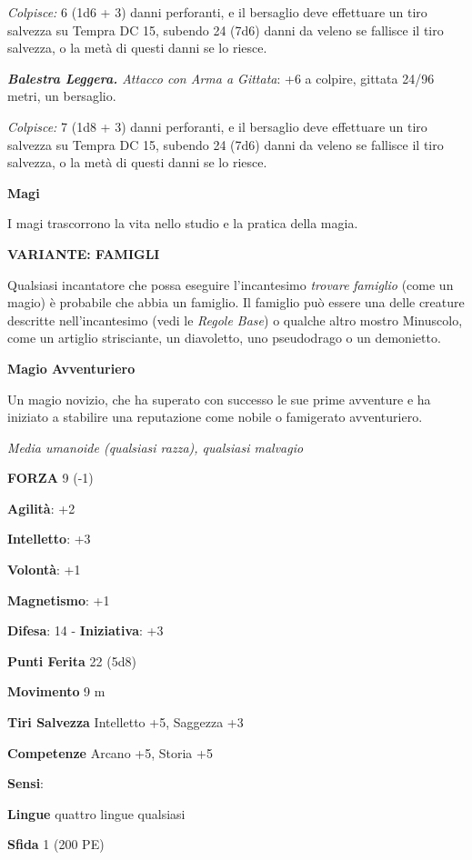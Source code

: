 \begin{multicols}{2}
\emph{Colpisce:} 6 (1d6 + 3) danni perforanti, e il bersaglio deve
effettuare un tiro salvezza su Tempra DC 15, subendo 24 (7d6)
danni da veleno se fallisce il tiro salvezza, o la metà di questi danni
se lo riesce.

\emph{\textbf{Balestra Leggera.} Attacco con Arma a Gittata}: +6 a
colpire, gittata 24/96 metri, un bersaglio.

\emph{Colpisce:} 7 (1d8 + 3) danni perforanti, e il bersaglio deve
effettuare un tiro salvezza su Tempra DC 15, subendo 24 (7d6)
danni da veleno se fallisce il tiro salvezza, o la metà di questi danni
se lo riesce.

\textbf{Magi}

I magi trascorrono la vita nello studio e la pratica della magia.

\textbf{VARIANTE: FAMIGLI}

Qualsiasi incantatore che possa eseguire l'incantesimo \emph{trovare}
\emph{famiglio} (come un magio) è probabile che abbia un famiglio. Il
famiglio può essere una delle creature descritte nell'incantesimo (vedi
le \emph{Regole Base}) o qualche altro mostro Minuscolo, come un
artiglio strisciante, un diavoletto, uno pseudodrago o un demonietto.

\textbf{Magio Avventuriero}

Un magio novizio, che ha superato con successo le sue prime avventure e
ha iniziato a stabilire una reputazione come nobile o famigerato
avventuriero.

\emph{Media umanoide (qualsiasi razza), qualsiasi malvagio}

\textbf{FORZA} 9 (-1)

\textbf{Agilità}: +2

\textbf{Intelletto}: +3

\textbf{Volontà}: +1

\textbf{Magnetismo}: +1

\textbf{Difesa}: 14 - \textbf{Iniziativa}: +3

\textbf{Punti Ferita} 22 (5d8)

\textbf{Movimento} 9 m

\textbf{Tiri Salvezza} Intelletto +5, Saggezza +3

\textbf{Competenze} Arcano +5, Storia +5

\textbf{Sensi}: 

\textbf{Lingue} quattro lingue qualsiasi

\textbf{Sfida} 1 (200 PE)\smallskip\\


\end{multicols}
